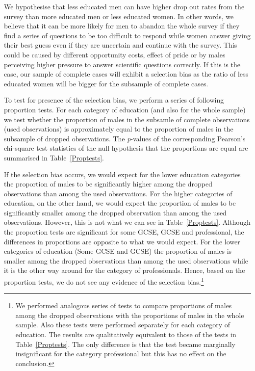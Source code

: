 \documentclass[a4paper,12pt]{article}
\begin{document}
We hypothesise that less educated men can have higher drop out rates from the survey than more educated men or less educated women. In other words, we believe that it can be more likely for men to abandon the whole survey if they find a series of questions to be too difficult to respond while women answer giving their best guess even if they are uncertain and continue with the survey. This could be caused by different opportunity costs, effect of pride or by males perceiving higher pressure to answer scientific questions correctly. If this is the case, our sample of complete cases will exhibit a selection bias as the ratio of less educated women will be bigger for the subsample of complete cases.

To test for presence of the selection bias, we perform a series of following proportion tests. For each category of education (and also for the whole sample) we test whether the proportion of males in the subsamle of complete observations (used observations) is approximately equal to the proportion of males in the subsample of dropped observations. The \textit{p}-values of the corresponding Pearson's chi-square test statistics of the null hypothesis that the proportions are equal are summarised in Table~\ref{Proptests}.

If the selection bias occurs, we would expect for the lower education categories the proportion of males to be significantly higher among the dropped observations than among the used observations. For the higher categories of education, on the other hand, we would expect the proportion of males to be significantly smaller among the dropped observation than among the used observations. However, this is not what we can see in Table~\ref{Proptests}. Although the proportion tests are significant for some GCSE, GCSE and professional, the differences in proportions are opposite to what we would expect. For the lower categories of education (Some GCSE and GCSE) the proportion of males is smaller among the dropped observations than among the used observations while it is the other way around for the category of professionals. Hence, based on the proportion tests, we do not see any evidence of the selection bias.\footnote{We performed analogous series of tests to compare proportions of males among the dropped observations with the proportions of males in the whole sample. Also these tests were performed separately for each category of education. The results are qualitatively equivalent to those of the tests in Table~\ref{Proptests}. The only difference is that the test became marginally insignificant for the category professional but this has no effect on the conclusion.}
\end{document}
